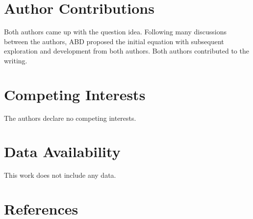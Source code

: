 \documentclass[
]{article}
\begin{document}
\section{Author Contributions}\label{author-contributions}

Both authors came up with the question idea. Following many discussions
between the authors, ABD proposed the initial equation with subsequent
exploration and development from both authors. Both authors contributed
to the writing.

\section{Competing Interests}\label{competing-interests}

The authors declare no competing interests.

\section{Data Availability}\label{data-availability}

This work does not include any data.

\section*{References}\label{references}
\end{document}
